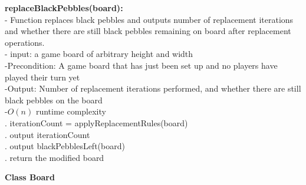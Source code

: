 \documentclass[12pt]{article}
\begin{document}
\begin{paragraph}
\indent\textbf{replaceBlackPebbles(board):}\\
\indent - Function replaces black pebbles and outputs number of replacement iterations and whether there are still black pebbles remaining on board after replacement operations.\\
\indent - input: a game board of arbitrary height and width\\
\indent -Precondition: A game board that has just been set up and no players have played their turn yet\\
\indent -Output: Number of replacement iterations performed, and whether there are still black pebbles on the board\\
\indent -$O(n)$ runtime complexity\\
\linebreak
\indent{}. iterationCount = applyReplacementRules(board)\\
\indent{}. output iterationCount\\
\indent{}. output blackPebblesLeft(board)\\
\indent{}. return the modified board\\
\end{paragraph}

\begin{flushleft}
\textbf{Class Board}\\
\end{flushleft}
\end{document}
